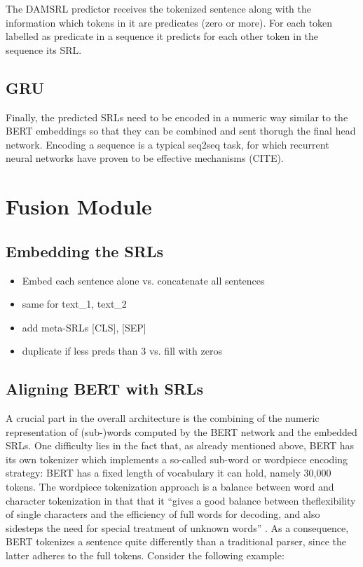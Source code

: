 The DAMSRL predictor receives the tokenized sentence along with the information which tokens in it are predicates (zero or more).
For each token labelled as predicate in a sequence it predicts for each other token in the sequence its SRL.

\subsection{GRU}

Finally, the predicted SRLs need to be encoded in a numeric way similar to the BERT embeddings so that they can be combined and sent thorugh the final head network.
Encoding a sequence is a typical seq2seq task, for which recurrent neural networks have proven to be effective mechanisms (CITE).

\section{Fusion Module}

\subsection{Embedding the SRLs}

\begin{itemize}
	\item Embed each sentence alone vs. concatenate all sentences
	\item same for text\_1, text\_2
	\item add meta-SRLs [CLS], [SEP]
	\item duplicate if less preds than 3 vs. fill with zeros
\end{itemize}

\subsection{Aligning BERT with SRLs}

A crucial part in the overall architecture is the combining of the numeric representation of (sub-)words computed by the BERT network and the embedded SRLs.
One difficulty lies in the fact that, as already mentioned above, BERT has its own tokenizer which implements a so-called sub-word or wordpiece \cite{wu2016google} encoding strategy:
BERT has a fixed length of vocabulary it can hold, namely 30,000 tokens.
The wordpiece tokenization approach is a balance between word and character tokenization in that that it ``gives a good balance between theflexibility of single characters and the efficiency of full words for decoding, and also sidesteps the need for special treatment of unknown words'' \citep[p.~2]{wu2016google}.
As a consequence, BERT tokenizes a sentence quite differently than a traditional parser, since the latter adheres to the full tokens.
Consider the following example:

